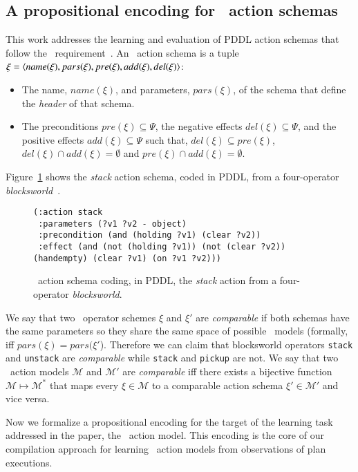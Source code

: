 \subsection{A propositional encoding for \strips\ action schemas}
This work addresses the learning and evaluation of PDDL action schemas that follow the \strips\ requirement~\cite{mcdermott1998pddl,fox2003pddl2}. An \strips\ action schema is a tuple $\xi={\langle name(\xi),pars(\xi),pre(\xi),add(\xi),del(\xi) \rangle}$:
\begin{itemize}
\item The name, $name(\xi)$, and parameters, $pars(\xi)$, of the schema that define the {\em header} of that schema. 
\item The preconditions $pre(\xi)\subseteq \Psi$, the negative effects $del(\xi)\subseteq \Psi$, and the positive effects $add(\xi)\subseteq \Psi$ such that, $del(\xi)\subseteq pre(\xi)$, $del(\xi)\cap add(\xi)=\emptyset$ and $pre(\xi)\cap add(\xi)=\emptyset$.
\end{itemize}
Figure~\ref{fig:stack} shows the {\em stack} action schema, coded in PDDL, from a four-operator {\em blocksworld}~\cite{slaney2001blocks}. 

\begin{figure}[hbt!]
\begin{footnotesize}
\begin{verbatim}
(:action stack
 :parameters (?v1 ?v2 - object)
 :precondition (and (holding ?v1) (clear ?v2))
 :effect (and (not (holding ?v1)) (not (clear ?v2)) (handempty) (clear ?v1) (on ?v1 ?v2)))
\end{verbatim}
\end{footnotesize}
 \caption{\small \strips\ action schema coding, in PDDL, the {\em stack} action from a four-operator {\em blocksworld}.}
\label{fig:stack}
\end{figure}
We say that two \strips\ operator schemes $\xi$ and $\xi'$ are {\em comparable} if both schemas have the same parameters so they share the same space of possible \strips\ models (formally, iff $pars(\xi)=pars(\xi'$). Therefore  we can claim that blocksworld operators {\tt stack} and {\tt unstack} are {\em comparable} while  {\tt stack} and {\tt pickup} are not. We say that two \strips\ action models $\mathcal{M}$ and $\mathcal{M}'$ are {\em comparable} iff there exists a bijective function $\mathcal{M} \mapsto \mathcal{M}^*$ that maps every $\xi\in\mathcal{M}$ to a comparable action schema $\xi'\in\mathcal{M'}$ and vice versa.

Now we formalize a propositional encoding for the target of the learning task addressed in the paper, the \strips\ action model. This encoding is the core of our compilation approach for learning \strips\ action models from observations of plan executions.

